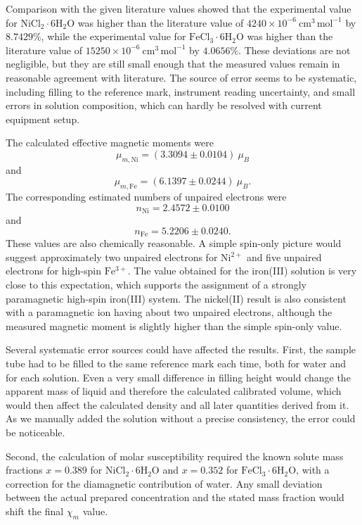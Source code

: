 \documentclass[12pt]{article}
\begin{document}
Comparison with the given literature values \cite{miller1985litmag,masson1957litmag} showed that the experimental value for \(\mathrm{NiCl_2\cdot 6H_2O}\) was higher than the literature value of \(4240\times10^{-6}\ \mathrm{cm^3\,mol^{-1}}\) by \(8.7429\%\), while the experimental value for \(\mathrm{FeCl_3\cdot 6H_2O}\) was higher than the literature value of \(15250\times10^{-6}\ \mathrm{cm^3\,mol^{-1}}\) by \(4.0656\%\). These deviations are not negligible, but they are still small enough that the measured values remain in reasonable agreement with literature. The source of error seems to be systematic, including filling to the reference mark, instrument
reading uncertainty, and small errors in solution composition, which can hardly be resolved with current equipment setup.

The calculated effective magnetic moments were
\[
\mu_{m,\mathrm{Ni}}=(3.3094 \pm 0.0104)\ \mu_B
\]
and
\[
\mu_{m,\mathrm{Fe}}=(6.1397 \pm 0.0244)\ \mu_B.
\]
The corresponding estimated numbers of unpaired electrons were
\[
n_{\mathrm{Ni}}=2.4572 \pm 0.0100
\]
and
\[
n_{\mathrm{Fe}}=5.2206 \pm 0.0240.
\]
These values are also chemically reasonable. A simple spin-only picture would suggest approximately two unpaired electrons for \(\mathrm{Ni^{2+}}\) and five unpaired electrons for high-spin \(\mathrm{Fe^{3+}}\). The value obtained for the iron(III) solution is very close to this expectation, which supports the assignment of a strongly paramagnetic high-spin iron(III) system. The nickel(II) result is also consistent with a paramagnetic ion having about two unpaired electrons, although the measured magnetic moment is slightly higher than the simple spin-only value. 

Several systematic error sources could have affected the results. First, the sample tube had to be filled to the same reference mark each time, both for water and for each solution. Even a very small difference in filling height would change the apparent mass of liquid and therefore the calculated calibrated volume, which would then affect the calculated density and all later quantities derived from it. As we manually added the solution without a precise consistency, the error could be noticeable.

Second, the calculation of molar susceptibility required the known solute mass fractions \(x=0.389\) for \(\mathrm{NiCl_2\cdot 6H_2O}\) and \(x=0.352\) for \(\mathrm{FeCl_3\cdot 6H_2O}\), with a correction for the diamagnetic contribution of water. Any small deviation between the actual prepared concentration and the stated mass fraction would shift the final \(\chi_m\) value.
\end{document}
